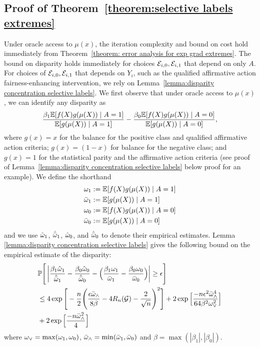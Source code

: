\documentclass{article}
\begin{document}
\subsection*{Proof of Theorem~\ref{theorem:selective labels extremes}}
Under oracle access to $\mu(x)$, the iteration complexity and bound on cost hold immediately from Theorem~\ref{theorem: error analysis for exp grad extremes}. 
The bound on disparity holds immediately for choices $\mathcal{E}_{i,0}, \mathcal{E}_{i,1}$ that depend on only $A$.
For choices of $\mathcal{E}_{i,0}, \mathcal{E}_{i,1}$ that depends on $Y_i$, such as the qualified affirmative action fairness-enhancing intervention, we rely on Lemma~\ref{lemma:disparity concentration selective labels}.
We first observe that under oracle access to $\mu(x)$, we can identify any disparity as 
\begin{equation}
\frac{\beta_1 \mathbb{E} [f(X) g(\mu(X)) \mid A = 1]}{\mathbb{E} [ g(\mu(X)) \mid A = 1]} - \frac{\beta_0 \mathbb{E} [f(X) g(\mu(X)) \mid A = 0]}{\mathbb{E} [ g(\mu(X)) \mid A = 0]},
\end{equation}
where $g(x) = x$ for the balance for the positive class and qualified affirmative action criteria; $g(x) = (1-x)$ for balance for the negative class; and $g(x) = 1$ for the statistical parity and the affirmative action criteria (see proof of Lemma~\ref{lemma:disparity concentration selective labels} below proof for an example).
We define the shorthand
\begin{eqnarray*}
& \omega_1 := \mathbb{E} [f(X) g(\mu(X)) \mid A = 1]\\
&\bar{\omega}_1 := \mathbb{E} [ g(\mu(X)) \mid A = 1] \\
&\omega_0 := \mathbb{E} [f(X) g(\mu(X)) \mid A = 0]\\ 
&\bar{\omega}_0 := \mathbb{E} [ g(\mu(X)) \mid A = 0] 
\end{eqnarray*}
and we use $\hat{\omega}_1$, $\hat{\bar{\omega}}_1$, $\hat{\omega}_0$, and $\hat{\bar{\omega}}_0$ to denote their empirical estimates.
Lemma \ref{lemma:disparity concentration selective labels} gives the following bound on the empirical estimate of the disparity:
\begin{align*}
& \mathbb{P}\Bigg[  \left| \frac{\beta_1 \hat{\omega}_1 }{\hat{\bar{\omega}}_1} - \frac{\beta_0 \hat{\omega}_0}{\hat{\bar{\omega}}_0} -  \Big(\frac{\beta_1 \omega_1}{\bar{\omega}_1} - \frac{\beta_0 \omega_0}{\bar{\omega}_0} \Big) \right| \geq \epsilon \Bigg] \\
 &\leq 4\exp\Bigg[-\frac{n}{2}\Bigg(\frac{\epsilon \bar{\omega}_{\wedge}}{8\beta}  - 4 R_n(\mathcal{G}) - \frac{2}{\sqrt{n}}\Bigg)^2 \Bigg] + 2\exp \Big[\frac{-n \epsilon^2 \bar{\omega}_{\wedge}^4}{64\beta^2\omega_{\vee}^2} \Big] \\
 &+2\exp\Big[\frac{-n\bar{\omega}_{\wedge}^2}{4} \Big]
\end{align*} 
where $\omega_{\vee} = \max(\omega_1, \omega_0)$, $\bar{\omega}_{\wedge} = \min(\bar{\omega}_1, \bar{\omega}_0)$ and ${\beta = \max(\left| \beta_1 \right|, \left |\beta_0 \right|)}$.
\end{document}
